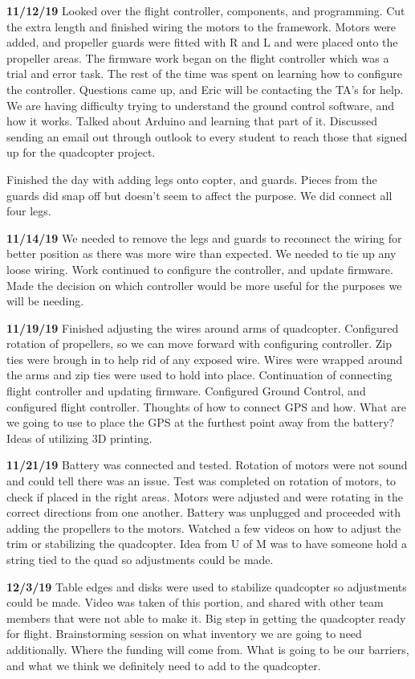 \textbf{11/12/19}    Looked over the flight controller, components, and programming. Cut the extra length and finished wiring the motors to the framework. Motors were added, and propeller guards were fitted with R and L and were placed onto the propeller areas. The firmware work began on the flight controller which was a trial and error task. The rest of the time was spent on learning how to configure the controller. Questions came up, and Eric will be contacting the TA's for help. We are having difficulty trying to understand the ground control software, and how it works. Talked about Arduino and learning that part of it. Discussed sending an email out through outlook to every student to reach those that signed up for the quadcopter project.

Finished the day with adding legs onto copter, and guards. Pieces from the guards did snap off but doesn't seem to affect the purpose. We did connect all four legs.

\textbf{11/14/19}    We needed to remove the legs and guards to reconnect the wiring for better position as there was more wire than expected. We needed to tie up any loose wiring. Work continued to configure the controller, and update firmware. Made the decision on which controller would be more useful for the purposes we will be needing.

\textbf{11/19/19}    Finished adjusting the wires around arms of quadcopter. Configured rotation of propellers, so we can move forward with configuring controller. Zip ties were brough in to help rid of any exposed wire. Wires were wrapped around the arms and zip ties were used to hold into place. Continuation of connecting flight controller and updating firmware. Configured Ground Control, and configured flight controller. Thoughts of how to connect GPS and how. What are we going to use to place the GPS at the furthest point away from the battery? Ideas of utilizing 3D printing.

\textbf{11/21/19}    Battery was connected and tested. Rotation of motors were not sound and could tell there was an issue. Test was completed on rotation of motors, to check if placed in the right areas. Motors were adjusted and were rotating in the correct directions from one another. Battery was unplugged and proceeded with adding the propellers to the motors. Watched a few videos on how to adjust the trim or stabilizing the quadcopter. Idea from U of M was to have someone hold a string tied to the quad so adjustments could be made.

\textbf{12/3/19}    Table edges and disks were used to stabilize quadcopter so adjustments could be made. Video was taken of this portion, and shared with other team members that were not able to make it. Big step in getting the quadcopter ready for flight. Brainstorming session on what inventory we are going to need additionally. Where the funding will come from. What is going to be our barriers, and what we think we definitely need to add to the quadcopter.

